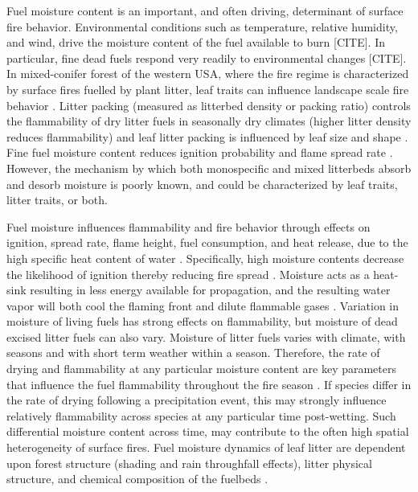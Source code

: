 \documentclass[fire,article,submit,moreauthors,pdftex]{Definitions/mdpi}
\begin{document}
Fuel moisture content is an important, and often driving, determinant of surface fire behavior. Environmental conditions such as temperature, relative humidity, and wind, drive the moisture content of the fuel available to burn [CITE]. In particular, fine dead fuels respond very readily to environmental changes [CITE]. In mixed-conifer forest of the western USA, where the fire regime is characterized by surface fires fuelled by plant litter, leaf traits can influence landscape scale fire behavior \cite{Schwilk+Caprio-2011}. Litter packing (measured as litterbed density or packing ratio) controls the flammability of dry litter fuels in seasonally dry climates (higher litter density reduces flammability) and leaf litter packing is influenced by leaf size and shape \cite{Fonda+Belanger+etal-1998, Kane+Varner+etal-2008, Schwilk+Caprio-2011, Kreye+Varner+etal-2013}. Fine fuel moisture content reduces ignition probability and flame spread rate \cite{Gisborne-1936, Fons-1946, Anderson+Rothermal-1965}. However, the mechanism by which both monospecific and mixed litterbeds absorb and desorb moisture is poorly known, and could be characterized by leaf traits, litter traits, or both.

Fuel moisture influences flammability and fire behavior through effects on ignition, spread rate, flame height, fuel consumption, and heat release, due to the high specific heat content of water \cite{Rothermel-1972}. Specifically, high moisture contents decrease the likelihood of ignition thereby reducing fire spread \cite{Nelson-2011}. Moisture acts as a heat-sink resulting in less energy available for propagation, and the resulting water vapor will both cool the flaming front and dilute flammable gases \cite{Albini-1976, Shafizadeh-1977}. Variation in moisture of living fuels has strong effects on flammability, but moisture of dead excised litter fuels can also vary. Moisture of litter fuels varies with climate, with seasons and with short term weather within a season. Therefore, the rate of drying and flammability at any particular moisture content are key parameters that influence the fuel flammability throughout the fire season \cite{Viney-1991}. If species differ in the rate of drying following a precipitation event, this may strongly influence relatively flammability across species at any particular time post-wetting.  Such differential moisture content across time, may contribute to the often high spatial heterogeneity of surface fires. Fuel moisture dynamics of leaf litter are dependent upon forest structure (shading and rain throughfall effects), litter physical structure, and chemical composition of the fuelbeds \cite{Nelson+Hiers-2008, Matthews-2014, Kreye_Hiers_etal-2018}.
\end{document}
